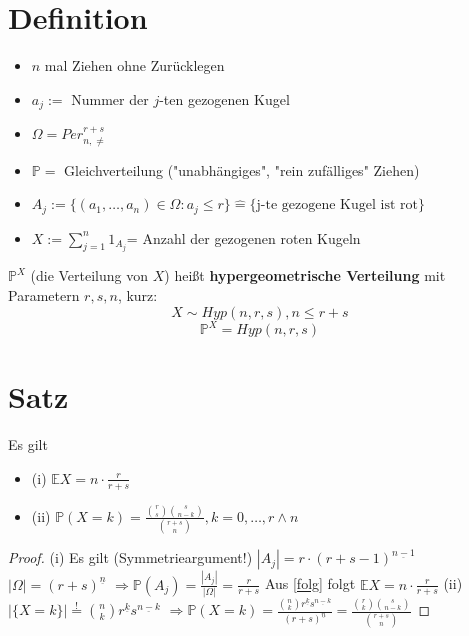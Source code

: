 \documentclass[a4paper,11pt,notitlepage]{report}
\newcommand{\Prim}{{\ensuremath{\mathbb{P}}}}
\newcommand{\E}{{\ensuremath{\mathbb{E}}}}
\begin{document}
\section{Definition}
\begin{itemize}
	\item $n$ mal Ziehen ohne Zurücklegen
	\item $a_j :=$ Nummer der $j$-ten gezogenen Kugel
	\item $\Omega = Per_{n,\neq}^{r+s}$
	\item $\Prim =$ Gleichverteilung ("unabhängiges", "rein zufälliges" Ziehen)
	\item $A_j := \{(a_1,\ldots,a_n) \in \Omega \colon a_j \leq r\} \hat{=} \{\text{j-te gezogene Kugel ist rot}\}$
	\item $X:= \sum\limits_{j=1}^{n}{1_{A_j}}$= Anzahl der gezogenen roten Kugeln
\end{itemize}
$\Prim^X$ (die Verteilung von $X$) heißt \textbf{hypergeometrische Verteilung} mit Parametern $r,s,n$, kurz:
$$X \sim Hyp(n,r,s), n \leq r+s$$
$$\Prim^X = Hyp(n,r,s)$$

\section{Satz}
Es gilt
\begin{itemize}
	\item (i) $\E X = n \cdot \frac{r}{r+s}$
	\item (ii) $\Prim(X=k) = \frac{{r \choose s}{s \choose {n-k}}}{{{r+s} \choose {n}}}, k = 0, \ldots, r \wedge n$
\end{itemize}

\begin{proof}
	(i) Es gilt (Symmetrieargument!) $|A_j| = r \cdot (r+s-1)^{\underline{n-1}}$
	\newline
	$|\Omega| = (r+s)^{\underline{n}}$
	$\Rightarrow \Prim(A_j) = \frac{|A_j|}{|\Omega|} = \frac{r}{r+s}$
	\newline
	Aus \ref{folg} folgt $\E X = n \cdot \frac{r}{r+s}$
	\newline
	(ii) $|\{X=k\}| \overset{!}{=} {n \choose k} r^{\underline{k}} s^{\underline{n-k}}$
	\newline
	$\Rightarrow \Prim(X=k) = \frac{{n \choose k} r^{\underline{k}} s^{\underline{n-k}}}{(r+s)^{\underline{n}}} = \frac{{r \choose k}{s \choose {n-k}}}{{{r+s}\choose n}}$
\end{proof}
\end{document}
